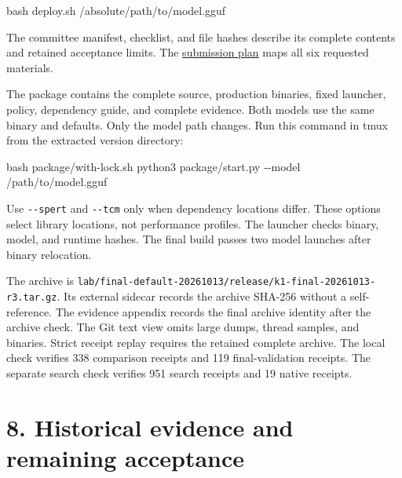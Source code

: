 \documentclass[10pt,a4paper]{article}
\newenvironment{Shaded}{}{}
\newcommand{\FunctionTok}[1]{\textcolor[rgb]{0.02,0.16,0.49}{#1}}
\newcommand{\NormalTok}[1]{#1}
\begin{document}
\begin{Shaded}
\begin{Highlighting}[]
\FunctionTok{bash}\NormalTok{ deploy.sh /absolute/path/to/model.gguf}
\end{Highlighting}
\end{Shaded}

The committee manifest, checklist, and file hashes describe its complete
contents and retained acceptance limits. The
\href{https://github.com/MoyaMryia/riscv-accl/blob/main/spacemit/final-release/SUBMISSION-PLAN.md}{submission
plan} maps all six requested materials.

The package contains the complete source, production binaries, fixed
launcher, policy, dependency guide, and complete evidence. Both models
use the same binary and defaults. Only the model path changes. Run this
command in tmux from the extracted version directory:

\begin{Shaded}
\begin{Highlighting}[]
\FunctionTok{bash}\NormalTok{ package/with{-}lock.sh python3 package/start.py {-}{-}model /path/to/model.gguf}
\end{Highlighting}
\end{Shaded}

Use \nolinkurl{--spert} and \nolinkurl{--tcm} only when dependency
locations differ. These options select library locations, not
performance profiles. The launcher checks binary, model, and runtime
hashes. The final build passes two model launches after binary
relocation.

The archive is
\nolinkurl{lab/final-default-20261013/release/k1-final-20261013-r3.tar.gz}.
Its external sidecar records the archive SHA-256 without a
self-reference. The evidence appendix records the final archive identity
after the archive check. The Git text view omits large dumps, thread
samples, and binaries. Strict receipt replay requires the retained
complete archive. The local check verifies 338 comparison receipts and
119 final-validation receipts. The separate search check verifies 951
search receipts and 19 native receipts.

\hypertarget{historical-evidence-and-remaining-acceptance}{%
\section{8. Historical evidence and remaining
acceptance}\label{historical-evidence-and-remaining-acceptance}}
\end{document}
